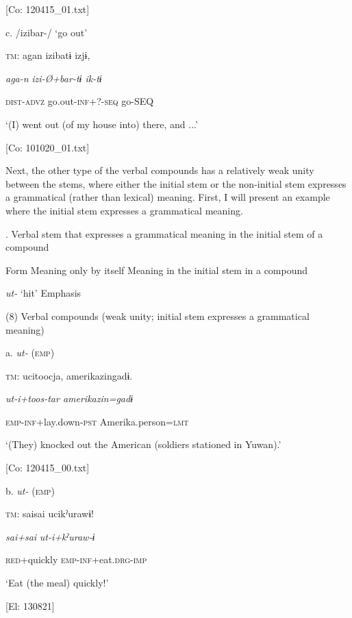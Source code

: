       [Co: 120415\_01.txt]

  c.  /izibar-/ ‘go out’

    \textsc{tm}:  agan  izibatɨ  izjɨ,

      \textit{aga-n}  \textit{izi-Ø+bar{}-tɨ  ik-tɨ}

      \textsc{dist}-\textsc{advz}  go.out-\textsc{inf}+?-\textsc{seq}  go-SEQ

      ‘(I) went out (of my house into) there, and ...’

      [Co: 101020\_01.txt]

  Next, the other type of the verbal compounds has a relatively weak unity between the stems, where either the initial stem or the non-initial stem expresses a grammatical (rather than lexical) meaning. First, I will present an example where the initial stem expresses a grammatical meaning.

\begin{styleBeschriftung}
\textmd{. Verbal stem that expresses a grammatical meaning in the initial stem of a compound}
\end{styleBeschriftung}

Form    Meaning only by itself    Meaning in the initial stem in a compound

\textit{ut-}    ‘hit’    Emphasis

(8)  Verbal compounds (weak unity; initial stem expresses a grammatical meaning)

  a.  \textit{ut-} (\textsc{emp})

    \textsc{tm}:  ucitoocja,  {\textbar}amerikazin{\textbar}gadɨ.

      \textit{ut{}-i+toos-tar  amerikazin=gadɨ}

      \textsc{emp}-\textsc{inf}+lay.down-\textsc{pst}  Amerika.person=\textsc{lmt}

      ‘(They) knocked out the American (soldiers stationed in Yuwan).’

      [Co: 120415\_00.txt]

  b.  \textit{ut-} (\textsc{emp})

    \textsc{tm}:  saisai  ucikˀurawɨ!

      \textit{sai+sai}  \textit{ut{}-i+kˀuraw-ɨ}

      \textsc{red}+quickly  \textsc{emp}-\textsc{inf}+eat.\textsc{drg}-\textsc{imp}

      ‘Eat (the meal) quickly!’

      [El: 130821]

